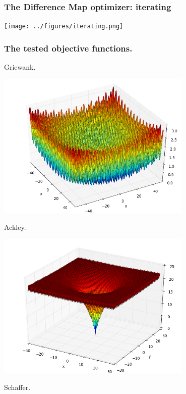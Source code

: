 \documentclass[mathserif]{beamer}
\begin{document}
\begin{frame}
    \frametitle{The Difference Map optimizer: iterating}

    \begin{center}
        \texttt{[image: ../figures/iterating.png]}
    \end{center}
\end{frame}

\begin{frame}[allowframebreaks]
    \frametitle{The tested objective functions.}

    \begin{center}
        Griewank.

        \includegraphics[height=7cm]{../figures/griewank.png}
    \end{center}

    \begin{center}
        Ackley.

        \includegraphics[height=7cm]{../figures/ackley.png}
    \end{center}

    \begin{center}
        Schaffer.


\end{center}
\end{frame}
\end{document}
